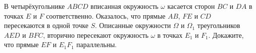 \documentclass{article}
\begin{document}
\begin{enumerate_boxed}
        \item В четырёхугольнике $ABCD$ вписанная окружность $\omega$ касается сторон $BC$ и $DA$ в точках $E$ и $F$ соответственно.
        Оказалось, что прямые $AB$, $FE$ и $CD$ пересекаются в одной точке $S$.
        Описанные окружности $\Omega$ и $\Omega_1$ треугольников $AED$ и $BFC$, вторично пересекают окружность $\omega$ в точках $E_1$ и $F_1$.
        Докажите, что прямые $EF$ и $E_{1}F_1$ параллельны.

    \end{enumerate_boxed}
\end{document}
